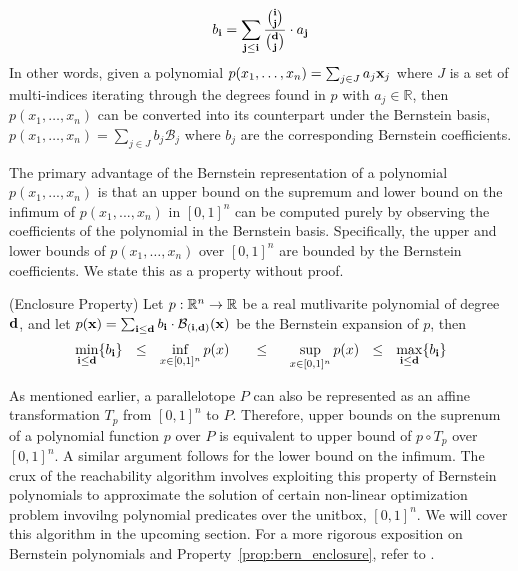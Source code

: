 \begin{equation}
b_{{\bf i}} = \sum_{{\bf j} \leq {\bf i}} \frac{\binom{{\bf i}}{{\bf j}}}{\binom{{\bf d}}{{\bf j}}}\cdot a_{{\bf j}}
\end{equation}
%
\noindent In other words, given a polynomial $p(x_1,\ldots,x_n) = \sum_{j \in J} a_j {\bf x}_{j}$ where $J$ is a set of multi-indices iterating through the degrees found in $p$ with $a_j \in \mathbb{R}$, then $p(x_1,\ldots,x_n)$ can be converted into its counterpart under the Bernstein basis, $p(x_1,\ldots,x_n) = \sum_{j \in J} b_j \mathcal{B}_j $ where $b_j$ are the corresponding Bernstein coefficients.

The primary advantage of the Bernstein representation of a polynomial $p(x_1,...,x_n)$ is that an upper bound on the supremum and lower bound on the infimum of $p(x_1,...,x_n)$ in $[0,1]^{n}$ can be computed purely by observing the coefficients of the polynomial in the Bernstein basis. Specifically, the upper and lower bounds of $p(x_1,\ldots,x_n)$ over $[0,1]^n$ are bounded by the Bernstein coefficients. We state this as a property without proof.
%
\begin{property} (Enclosure Property)
  \label{prop:bern_enclosure}
  Let $p: {\mathbb{R}}^n \rightarrow {\mathbb{R}}$ be a real mutlivarite polynomial of degree ${\bf d}$, and let $p({\bf x}) = \sum_{{\bf i} \leq {\bf d}} b_{\bf i} \cdot \mathcal{B}_{({\bf i},{\bf d})}({\bf x})$ be the Bernstein expansion of $p$, then
  $$
  \min_{{\bf i} \leq {\bf d}} \{b_{\bf i}\} ~~\leq~~ \inf_{x \in [0,1]^n} p(x) ~~~~~\leq~~~~ \sup_{x \in [0,1]^{n}} p(x) ~~\leq~~ \max_{{\bf i} \leq {\bf d}} \{b_{\bf i}\}
  $$
\end{property}


As mentioned earlier, a parallelotope $P$ can also be represented as an affine transformation $T_{p}$ from $[0,1]^{n}$ to $P$.
%
Therefore, upper bounds on the suprenum of a polynomial function $p$ over $P$ is equivalent to upper bound of $p \circ T_{p}$ over $[0,1]^{n}$.
%
A similar argument follows for the lower bound on the infimum.
%
The crux of the reachability algorithm involves exploiting this property of Bernstein polynomials to approximate the solution of certain non-linear optimization problem invovilng polynomial predicates over the unitbox, $[0,1]^n$.
%
We will cover this algorithm in the upcoming section.
%
For a more rigorous exposition on Bernstein polynomials and Property~\ref{prop:bern_enclosure}, refer to \cite{garloff2003bernstein}.


